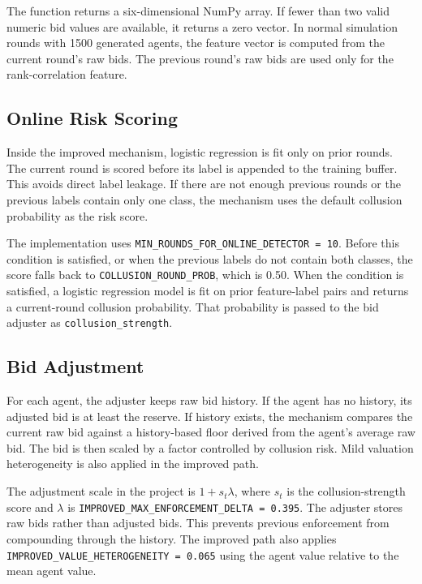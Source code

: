 \documentclass[conference]{IEEEtran}
\begin{document}
The function returns a six-dimensional NumPy array. If fewer than two valid numeric bid values are available, it returns a zero vector. In normal simulation rounds with 1500 generated agents, the feature vector is computed from the current round's raw bids. The previous round's raw bids are used only for the rank-correlation feature.

\subsection{Online Risk Scoring}
Inside the improved mechanism, logistic regression is fit only on prior rounds. The current round is scored before its label is appended to the training buffer. This avoids direct label leakage. If there are not enough previous rounds or the previous labels contain only one class, the mechanism uses the default collusion probability as the risk score.

The implementation uses \texttt{MIN\_ROUNDS\_FOR\_ONLINE\_DETECTOR = 10}. Before this condition is satisfied, or when the previous labels do not contain both classes, the score falls back to \texttt{COLLUSION\_ROUND\_PROB}, which is 0.50. When the condition is satisfied, a logistic regression model is fit on prior feature-label pairs and returns a current-round collusion probability. That probability is passed to the bid adjuster as \texttt{collusion\_strength}.

\subsection{Bid Adjustment}
For each agent, the adjuster keeps raw bid history. If the agent has no history, its adjusted bid is at least the reserve. If history exists, the mechanism compares the current raw bid against a history-based floor derived from the agent's average raw bid. The bid is then scaled by a factor controlled by collusion risk. Mild valuation heterogeneity is also applied in the improved path.

The adjustment scale in the project is $1 + s_t \lambda$, where $s_t$ is the collusion-strength score and $\lambda$ is \texttt{IMPROVED\_MAX\_ENFORCEMENT\_DELTA = 0.395}. The adjuster stores raw bids rather than adjusted bids. This prevents previous enforcement from compounding through the history. The improved path also applies \texttt{IMPROVED\_VALUE\_HETEROGENEITY = 0.065} using the agent value relative to the mean agent value.
\end{document}

